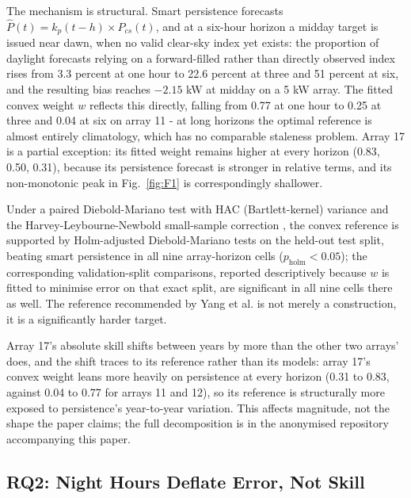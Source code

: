 The mechanism is structural. Smart persistence forecasts $\hat{P}(t) =
k_p(t-h) \times P_{cs}(t)$, and at a six-hour horizon a midday target
is issued near dawn, when no valid clear-sky index yet exists: the
proportion of daylight forecasts relying on a forward-filled rather
than directly observed index rises from 3.3 percent at one hour to
22.6 percent at three and 51 percent at six, and the resulting bias
reaches $-2.15$ kW at midday on a 5 kW array. The fitted convex weight
$w$ reflects this directly, falling from 0.77 at one hour to 0.25 at
three and 0.04 at six on array 11 - at long horizons the optimal
reference is almost entirely climatology, which has no comparable
staleness problem. Array 17 is a partial exception: its fitted weight
remains higher at every horizon (0.83, 0.50, 0.31), because its
persistence forecast is stronger in relative terms, and its
non-monotonic peak in Fig.~\ref{fig:F1} is correspondingly shallower.



Under a paired Diebold-Mariano test with HAC (Bartlett-kernel)
variance and the Harvey-Leybourne-Newbold small-sample correction
\cite{diebold1995comparing, harvey1997testing}, the convex reference is
supported by Holm-adjusted Diebold-Mariano tests on the held-out test
split, beating smart persistence in all nine array-horizon cells
($p_{\text{holm}} < 0.05$); the corresponding validation-split
comparisons, reported descriptively because $w$ is fitted to minimise
error on that exact split, are significant in all nine cells there as
well. The reference recommended by Yang et al. is not merely a
construction, it is a significantly harder target.

Array 17's absolute skill shifts between years by more than the other
two arrays' does, and the shift traces to its reference rather than
its models: array 17's convex weight leans more heavily on
persistence at every horizon (0.31 to 0.83, against 0.04 to 0.77 for
arrays 11 and 12), so its reference is structurally more exposed to
persistence's year-to-year variation. This affects magnitude, not the
shape the paper claims; the full decomposition is in the anonymised
repository accompanying this paper.

\subsection{RQ2: Night Hours Deflate Error, Not Skill}
\label{sec:rq1-night}

